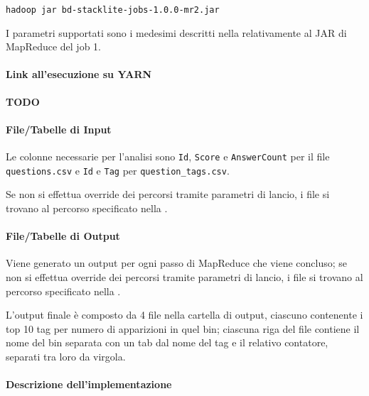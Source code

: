   \texttt{hadoop jar bd-stacklite-jobs-1.0.0-mr2.jar}

  I parametri supportati sono i medesimi descritti nella  relativamente al JAR di MapReduce del job 1.

  \paragraph{Link all'esecuzione su YARN}\label{par:job2:mapreduce:yarn}

  \textbf{TODO}

  \paragraph{File/Tabelle di Input}\label{par:job2:mapreduce:input}

  Le colonne necessarie per l'analisi sono \texttt{Id}, \texttt{Score} e \texttt{AnswerCount} per il file \texttt{questions.csv}
  e \texttt{Id} e \texttt{Tag} per \texttt{question\_tags.csv}.

  Se non si effettua override dei percorsi tramite parametri di lancio, i file si trovano al percorso specificato nella .

  \paragraph{File/Tabelle di Output}\label{par:job2:mapreduce:output}

  Viene generato un output per ogni passo di MapReduce che viene concluso;
  se non si effettua override dei percorsi tramite parametri di lancio, i file si trovano al percorso specificato nella .

  L'output finale è composto da 4 file nella cartella di output, ciascuno contenente i top 10 tag per numero di apparizioni in quel bin;
  ciascuna riga del file contiene il nome del bin separata con un tab dal nome del tag e il relativo contatore, separati tra loro da virgola.

  \paragraph{Descrizione dell'implementazione}\label{par:job2:mapreduce:implementation}

